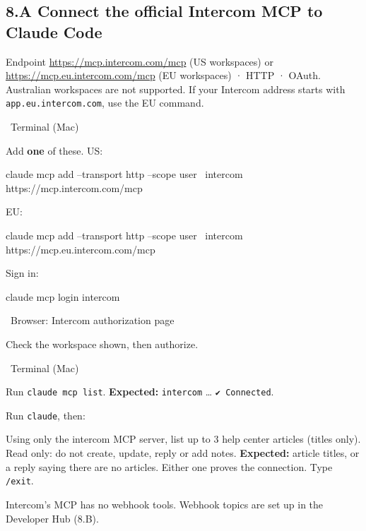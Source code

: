 \documentclass[11pt,a4paper]{article}
\newcommand{\where}[1]{\par\smallskip\noindent\colorbox{winbg}{\color{winfg}\bfseries\strut\ #1\ }\par\nopagebreak[4]}
\newcommand{\lit}[1]{\texttt{#1}}
\newenvironment{prompt}{\def\FrameCommand{\fboxsep=6pt\fcolorbox{Gray}{okbg}}\MakeFramed{\advance\hsize-\width\FrameRestore}\raggedright}{\endMakeFramed}
\begin{document}
\subsection*{8.A Connect the official Intercom MCP to Claude Code}
Endpoint \url{https://mcp.intercom.com/mcp} (US workspaces) or \url{https://mcp.eu.intercom.com/mcp} (EU workspaces) · HTTP · OAuth. Australian workspaces are not supported. If your Intercom address starts with \lit{app.eu.intercom.com}, use the EU command.
\where{Terminal (Mac)}
\begin{steps}
\item Add \textbf{one} of these. US:
\begin{cmd}
claude mcp add --transport http --scope user \
  intercom https://mcp.intercom.com/mcp
\end{cmd}
EU:
\begin{cmd}
claude mcp add --transport http --scope user \
  intercom https://mcp.eu.intercom.com/mcp
\end{cmd}
\item Sign in:
\begin{cmd}
claude mcp login intercom
\end{cmd}
\where{Browser: Intercom authorization page}
\item Check the workspace shown, then authorize.
\where{Terminal (Mac)}
\item Run \lit{claude mcp list}. \textbf{Expected:} \lit{intercom} … \lit{✔ Connected}.
\item Run \lit{claude}, then:
\begin{prompt}
Using only the intercom MCP server, list up to 3 help center articles (titles only). Read only: do not create, update, reply or add notes.
\end{prompt}
\textbf{Expected:} article titles, or a reply saying there are no articles. Either one proves the connection. Type \lit{/exit}.
\end{steps}
Intercom's MCP has no webhook tools. Webhook topics are set up in the Developer Hub (8.B).
\end{document}
